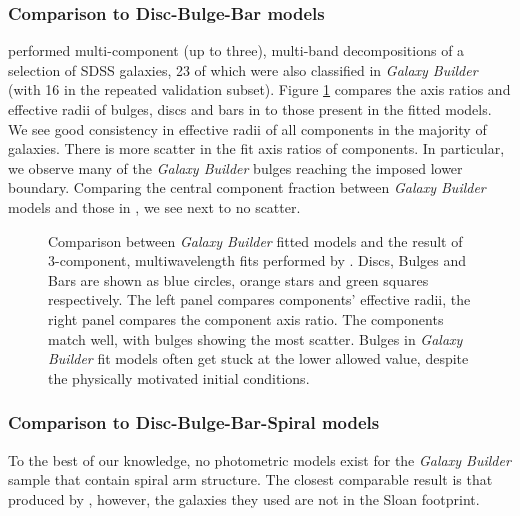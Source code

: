\documentclass[trackchanges]{aastex63}
\begin{document}
\begin{figure*}
  \caption{Scatter plots comparing measured model parameters between \citeauthor{2015MNRAS.446.3943M} (\citeyear{2015MNRAS.446.3943M}, x-axis) and \textit{Galaxy Builder} (y-axis). We note that adding spirals to a model does not strongly impact disc parameters, but the presence of a bar has a significant impact on bulge S\'ersic index measurement.}
  \label{fig:meert-comparison}
\end{figure*}


\subsubsection{Comparison to Disc-Bulge-Bar models}

\citet{2018MNRAS.473.4731K} performed multi-component (up to three), multi-band decompositions of a selection of SDSS galaxies, 23 of which were also classified in \textit{Galaxy Builder} (with 16 in the repeated validation subset). Figure \ref{fig:sd_comp_comparison} compares the axis ratios and effective radii of bulges, discs and bars in \citet{2018MNRAS.473.4731K} to those present in the fitted models. We see good consistency in effective radii of all components in the majority of galaxies. There is more scatter in the fit axis ratios of components. In particular, we observe many of the \textit{Galaxy Builder} bulges reaching the imposed lower boundary. Comparing the central component fraction between \textit{Galaxy Builder} models and those in \citet{2018MNRAS.473.4731K}, we see next to no scatter.

\begin{figure}
  \caption{Comparison between \textit{Galaxy Builder} fitted models and the result of 3-component, multi\-wavelength fits performed by \citet{2018MNRAS.473.4731K}. Discs, Bulges and Bars are shown as blue circles, orange stars and green squares respectively. The left panel compares components' effective radii, the right panel compares the component axis ratio. The components match well, with bulges showing the most scatter. Bulges in \textit{Galaxy Builder} fit models often get stuck at the lower allowed value, despite the physically motivated initial conditions.}
  \label{fig:sd_comp_comparison}
\end{figure}

\subsubsection{Comparison to Disc-Bulge-Bar-Spiral models}
To the best of our knowledge, no photometric models exist for the \textit{Galaxy Builder} sample that contain spiral arm structure. The closest comparable result is that produced by \citet{Gao2017:1709.00746v1}, however, the galaxies they used are not in the Sloan footprint.
\end{document}
